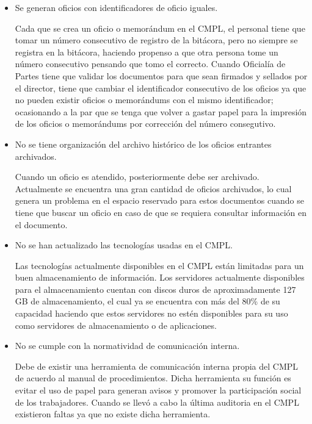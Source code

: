 \begin{itemize}
	\item Se generan oficios con identificadores de oficio iguales.		
	
Cada que se crea un oficio o memorándum en el CMPL, el personal tiene que tomar un número consecutivo de registro de la bitácora, pero no siempre se registra en la bitácora, haciendo propenso a que otra persona tome un número consecutivo pensando que tomo el correcto. Cuando Oficialía de Partes tiene que validar los documentos para que sean firmados y sellados por el director, tiene que cambiar el identificador consecutivo de los oficios ya que no pueden existir oficios o memorándums con el mismo identificador; ocasionando a la par	que se tenga que volver a gastar papel para la impresión de los oficios o memorándums por corrección del número consegutivo.

	\item No se tiene organización del archivo histórico de los oficios entrantes archivados.	
	
Cuando un oficio es atendido, posteriormente debe ser archivado. Actualmente se encuentra una gran cantidad de oficios archivados, lo cual genera un problema en el espacio reservado para estos documentos cuando se tiene que buscar un oficio en caso de que se requiera consultar información en el documento.
	
	\item No se han actualizado las tecnologías usadas en el CMPL.
	
Las tecnologías actualmente disponibles en el CMPL están limitadas para un buen almacenamiento de información. Los servidores actualmente disponibles  para el almacenamiento cuentan con discos duros de aproximadamente 127 GB de almacenamiento, el cual ya se encuentra con más del 80\% de su capacidad haciendo que estos servidores no estén disponibles para su uso como servidores de almacenamiento o de aplicaciones.

	\item No se cumple con la normatividad de comunicación interna.	
	
Debe de existir una herramienta de comunicación interna propia del CMPL de acuerdo al manual de procedimientos. Dicha herramienta su función es evitar el uso de papel para generan avisos y promover la participación social de los trabajadores. Cuando se llevó a cabo la última auditoria en el CMPL existieron faltas ya que no existe dicha herramienta.
	
\end{itemize}

